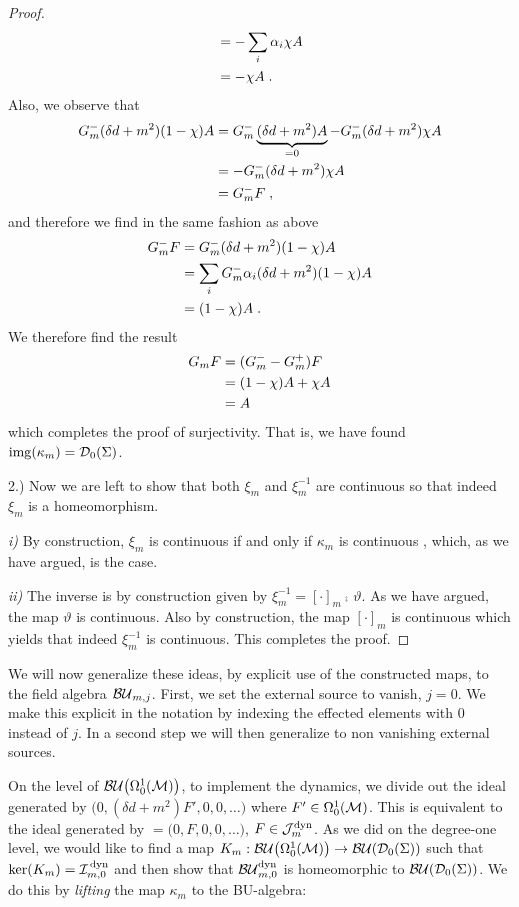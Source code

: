 \begin{proof}
\begin{align}
	&= -  \sum_i \alpha_i \chi A\notag \\
	&= - \chi A \;.
\end{align}
Also, we observe that
\begin{align}
	G_m^- (\delta d + m^2) (1-\chi) A
	&=  G_m^- \underbrace{(\delta d + m^2)  A}_{= 0} - G_m^- (\delta d + m^2)\chi A \notag\\
	&= - G_m^- (\delta d + m^2)\chi A \notag\\
	&= G_m^- F \;,
\end{align}
and therefore we find in the same fashion as above
\begin{align}
G_m^- F
&=  G_m^- (\delta d + m^2) (1-\chi) A \notag\\
&=  \sum_i G_m^- \alpha_i (\delta d + m^2) (1-\chi) A \notag\\
&=  (1-\chi) A \;.
\end{align}
We therefore find the result
\begin{align}
G_m F
&= (G_m^- - G_m^+)F \notag\\
&= (1- \chi) A + \chi A \notag\\
&= A
\end{align}
which completes the proof of surjectivity. That is, we have found $\mathrm{img}{}(\kappa_m) = \mathcal{D}_{0}(\Sigma)$.\par
2.) Now we are left to show that both $\xi_m$ and $\xi_m^{-1}$ are continuous so that indeed $\xi_m$ is a homeomorphism.\par
\emph{i)} By construction, $\xi_m$ is continuous if and only if $\kappa_m$ is continuous \cite[Proposition 4.6]{treves}, which, as we have argued, is the case.\par
\emph{ii)} The inverse is by construction given by $\xi_m^{-1} = [\cdot]_m \comp \,\vartheta$. As we have argued, the map $\vartheta$ is continuous. Also by construction, the map $[\cdot]_m$ is continuous which yields that indeed $\xi^{-1}_m$ is continuous.
This completes the proof.
\end{proof}
\par We will now generalize these ideas, by explicit use of the constructed maps, to the field algebra ${\mathcal{BU}_{m,j}}$.
First, we set the external source to vanish, $j = 0$. We make this explicit in the notation by indexing the effected elements with $0$ instead of $j$. In a second step we will then generalize to non vanishing external sources.\par
On the level of ${\mathcal{BU}\big(\Omega^1_0(\mathcal{M})\big)}$, to implement the dynamics, we divide out the ideal generated by $\big(0,(\delta d + m^2)F',0,0,\dots\big)$  where $F'\in \Omega^1_0(\mathcal{M})$. This is equivalent to the ideal generated by $= \big(0,F,0,0,\dots\big)$, $F \in \mathcal{J}_m^\text{dyn}$. As we did on the degree-one level, we would like to find a map $K_m : {\mathcal{BU}\big(\Omega^1_0(\mathcal{M})\big)} \to \mathcal{BU}(\mathcal{D}_{0}(\Sigma))$ such that $\textrm{ker}{\left(K_m\right)} = \mathcal{I}_{m,0}^\text{\,dyn}$ and then show that $\mathcal{BU}_{m,0}^\text{dyn}$ is homeomorphic to $\mathcal{BU}(\mathcal{D}_{0}(\Sigma))$. We do this by \emph{lifting} the map $\kappa_m$ to the BU-algebra:
